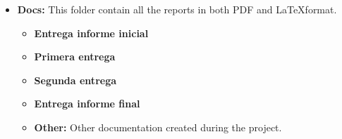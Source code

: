 \documentclass[]{article}
\begin{document}
\begin{itemize}
	\item \textbf{Docs:} This folder contain all the reports in both PDF and \LaTeX format.
	\begin{itemize}
		\item \textbf{Entrega informe inicial}
		
		\item \textbf{Primera entrega}
		
		\item \textbf{Segunda entrega} 
		
		\item \textbf{Entrega informe final}
		
		\item \textbf{Other:} Other documentation created during the project.
	\end{itemize}
	
\end{itemize}
\end{document}
